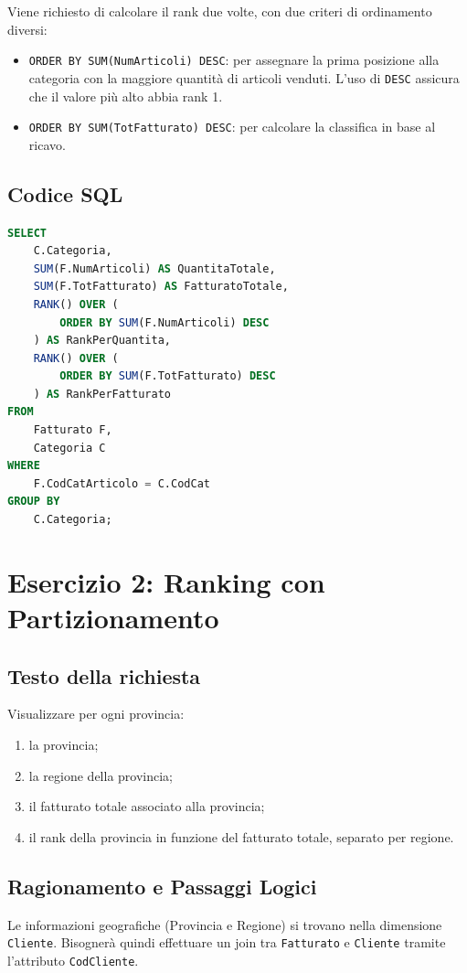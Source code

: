 Viene richiesto di calcolare il rank due volte, con due criteri di ordinamento diversi:
\begin{itemize}
    \item \texttt{ORDER BY SUM(NumArticoli) DESC}: per assegnare la prima posizione alla categoria con la maggiore quantità di articoli venduti. L'uso di \texttt{DESC} assicura che il valore più alto abbia rank 1.
    \item \texttt{ORDER BY SUM(TotFatturato) DESC}: per calcolare la classifica in base al ricavo.
\end{itemize}

\subsection{Codice SQL}
\begin{lstlisting}[language=SQL, basicstyle=\ttfamily\small, keywordstyle=\color{blue}, stringstyle=\color{red}, commentstyle=\color{green!60!black}]
SELECT 
    C.Categoria,
    SUM(F.NumArticoli) AS QuantitaTotale,
    SUM(F.TotFatturato) AS FatturatoTotale,
    RANK() OVER (
        ORDER BY SUM(F.NumArticoli) DESC
    ) AS RankPerQuantita,
    RANK() OVER (
        ORDER BY SUM(F.TotFatturato) DESC
    ) AS RankPerFatturato
FROM 
    Fatturato F, 
    Categoria C
WHERE 
    F.CodCatArticolo = C.CodCat
GROUP BY 
    C.Categoria;
\end{lstlisting}

\section{Esercizio 2: Ranking con Partizionamento}

\subsection{Testo della richiesta}
Visualizzare per ogni provincia:
\begin{enumerate}
    \item la provincia;
    \item la regione della provincia;
    \item il fatturato totale associato alla provincia;
    \item il rank della provincia in funzione del fatturato totale, separato per regione.
\end{enumerate}

\subsection{Ragionamento e Passaggi Logici}
Le informazioni geografiche (Provincia e Regione) si trovano nella dimensione \texttt{Cliente}. Bisognerà quindi effettuare un join tra \texttt{Fatturato} e \texttt{Cliente} tramite l'attributo \texttt{CodCliente}.

